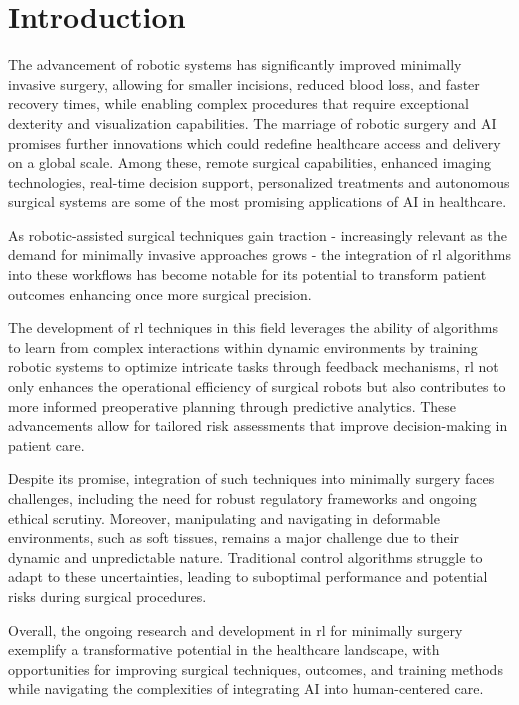 \chapter{Introduction}

The advancement of robotic systems has significantly improved minimally 
invasive surgery, allowing for smaller incisions, reduced blood loss, and faster recovery times, 
while enabling complex procedures that require exceptional dexterity and visualization capabilities.
The marriage of robotic surgery and AI promises further innovations which could redefine 
healthcare access and delivery on a global scale.
Among these, remote surgical capabilities, enhanced imaging technologies, real-time decision 
support, personalized treatments and autonomous surgical systems are some of the most promising applications
of AI in healthcare. 

As robotic-assisted surgical techniques gain traction - increasingly relevant as the demand for minimally 
invasive approaches grows -
the integration of \gls{rl} algorithms into these workflows has become notable for its potential to 
transform patient outcomes enhancing once more surgical precision. 

The development of \gls{rl} techniques in this field leverages the ability of algorithms to learn 
from complex interactions within dynamic environments by training robotic systems to 
optimize intricate tasks through feedback mechanisms, \gls{rl} not only enhances the operational efficiency 
of surgical robots but also contributes to more informed preoperative planning through predictive 
analytics. 
These advancements allow for tailored risk assessments that improve decision-making in patient care.


Despite its promise, integration of such techniques into minimally surgery faces
challenges, including the need for robust regulatory frameworks and ongoing ethical scrutiny.
Moreover, manipulating and navigating in deformable environments, such as soft tissues, 
remains a major challenge due to their dynamic and unpredictable nature. 
Traditional control algorithms struggle to adapt to these uncertainties, leading to 
suboptimal performance and potential risks during surgical procedures. 

Overall, the ongoing research and development in \gls{rl} for minimally 
surgery exemplify a transformative potential in the healthcare landscape, with opportunities for 
improving surgical techniques, outcomes, and training methods while navigating the complexities 
of integrating AI into human-centered care.

